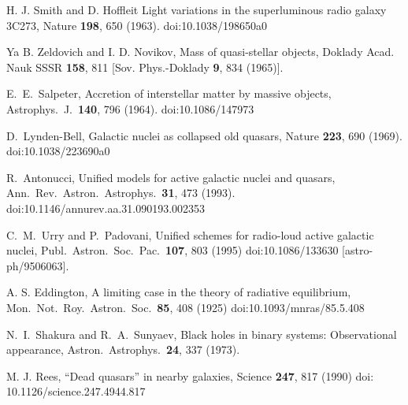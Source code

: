 \documentclass[aps,prd,twocolumn,superscriptaddress,tightenlines,nofootinbib]{revtex4-1}
\begin{document}
\begin{thebibliography}{99}
H. J. Smith and D. Hoffleit
{\color{rossoCP3} Light variations in the superluminous radio galaxy 3C273},
Nature {\bf 198},  650 (1963).
doi:10.1038/198650a0


Ya B. Zeldovich and I. D. Novikov, 
  {\color{rossoCP3} Mass of quasi-stellar objects}, 
Doklady Acad. Nauk SSSR {\bf 158}, 811 [Sov. Phys.-Doklady {\bf 9}, 834 (1965)].


  E.~E.~Salpeter,
 {\color{rossoCP3} Accretion of interstellar matter by massive objects},
  Astrophys.\ J.\  {\bf 140}, 796 (1964).
  doi:10.1086/147973



  D.~Lynden-Bell,
 {\color{rossoCP3}  Galactic nuclei as collapsed old quasars},
  Nature {\bf 223}, 690 (1969).
  doi:10.1038/223690a0


  R.~Antonucci,
  {\color{rossoCP3} Unified models for active galactic nuclei and quasars},
  Ann.\ Rev.\ Astron.\ Astrophys.\  {\bf 31}, 473 (1993).
  doi:10.1146/annurev.aa.31.090193.002353



  C.~M.~Urry and P.~Padovani,
   {\color{rossoCP3} Unified schemes for radio-loud active galactic nuclei},
  Publ.\ Astron.\ Soc.\ Pac.\  {\bf 107}, 803 (1995)
  doi:10.1086/133630
  [astro-ph/9506063].



A. S. Eddington,
 {\color{rossoCP3}  A limiting case in the theory of radiative
   equilibrium},
 Mon.\ Not.\ Roy.\ Astron.\ Soc.\  {\bf 85}, 408 (1925)
  doi:10.1093/mnras/85.5.408

  N.~I.~Shakura and R.~A.~Sunyaev,
     {\color{rossoCP3} Black holes in binary systems: Observational appearance},
  Astron.\ Astrophys.\  {\bf 24}, 337 (1973).





M. J. Rees,
  {\color{rossoCP3} ``Dead quasars'' in nearby galaxies},
Science {\bf 247}, 817 (1990)
doi: 10.1126/science.247.4944.817





\end{thebibliography}
\end{document}
